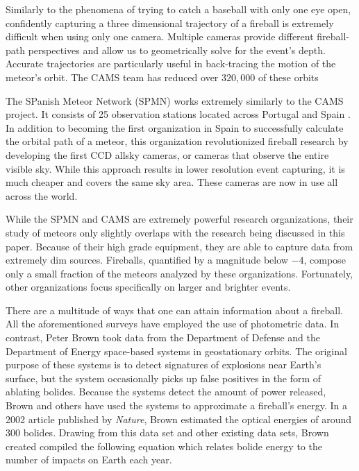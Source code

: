 Similarly to the phenomena of trying to catch a baseball with only one eye open, confidently capturing a three dimensional trajectory of a fireball is extremely difficult when using only one camera.
Multiple cameras provide different fireball-path perspectives and allow us to geometrically solve for the event's depth.
Accurate trajectories are particularly useful in back-tracing the motion of the meteor's orbit.  
The CAMS team has reduced over $320,000$ of these orbits \cite{peter_jenniskens_cameras_2018}


The SPanish Meteor Network (SPMN) works extremely similarly to the CAMS project.  
It consists of 25 observation stations located across Portugal and Spain \cite{trigo-rodriguez_2006_2007}.
In addition to becoming the first organization in Spain to successfully calculate the orbital path of a meteor, this organization revolutionized fireball research by developing the first CCD allsky cameras, or cameras that observe the entire visible sky. \cite{jordi_l._pique_presentation_nodate}
While this approach results in lower resolution event capturing, it is much cheaper and covers the same sky area.
These cameras are now in use all across the world.

While the SPMN and CAMS are extremely powerful research organizations, their study of meteors only slightly overlaps with the research being discussed in this paper.
Because of their high grade equipment, they are able to capture data from extremely dim sources.
Fireballs, quantified by a magnitude below $-4$, compose only a small fraction of the meteors analyzed by these organizations.
Fortunately, other organizations focus specifically on larger and brighter events.

There are a multitude of ways that one can attain information about a fireball.  
All the aforementioned surveys have employed the use of photometric data.
In contrast, Peter Brown took data from the Department of Defense and the Department of Energy space-based systems in geostationary orbits.
The original purpose of these systems is to detect signatures of explosions near Earth's surface, but the system occasionally picks up false positives in the form of ablating bolides.  
Because the systems detect the amount of power released, Brown and others have used the systems to approximate a fireball's energy.
In a 2002 article published by \textit{Nature}, Brown estimated the optical energies of around 300 bolides.
Drawing from this data set and other existing data sets, Brown created compiled the following equation which relates bolide energy to the number of impacts on Earth each year. 

